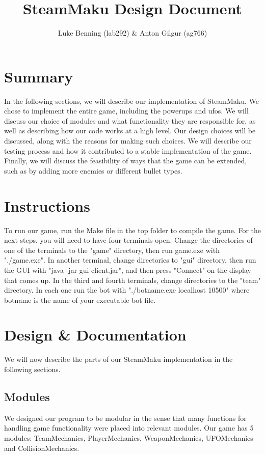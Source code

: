 \documentclass{article}
\begin{document}
\title{SteamMaku Design Document}
\author{Luke Benning (lab292) \& Anton Gilgur (ag766)}

\maketitle

\section{Summary}
In the following sections, we will describe our implementation of SteamMaku. We chose to implement the entire game, including the powerups and ufos. We will discuss our choice of modules and what functionality they are responsible for, as well as describing how our code works at a high level. Our design choices will be discussed, along with the reasons for making such choices. We will describe our testing process and how it contributed to a stable implementation of the game. Finally, we will discuss the feasibility of ways that the game can be extended, such as by adding more enemies or different bullet types.

\section{Instructions}
To run our game, run the Make file in the top folder to compile the game. For the next steps, you will need to have four terminals open. Change the directories of one of the terminals to the "game" directory, then run game.exe with "./game.exe". In another terminal, change directories to "gui" directory, then run the GUI with "java -jar gui client.jar", and then press "Connect" on the display that comes up. In the third and fourth terminals, change directories to the "team" directory. In each one run the bot with "./botname.exe localhost 10500" where botname is the name of your executable bot file.

\section{Design \& Documentation}
We will now describe the parts of our SteamMaku implementation in the following sections.

\subsection{Modules}
We designed our program to be modular in the sense that many functions for handling game functionality were placed into relevant modules.
Our game has 5 modules: TeamMechanics, PlayerMechanics, WeaponMechanics, UFOMechanics and CollisionMechanics.
\end{document}
